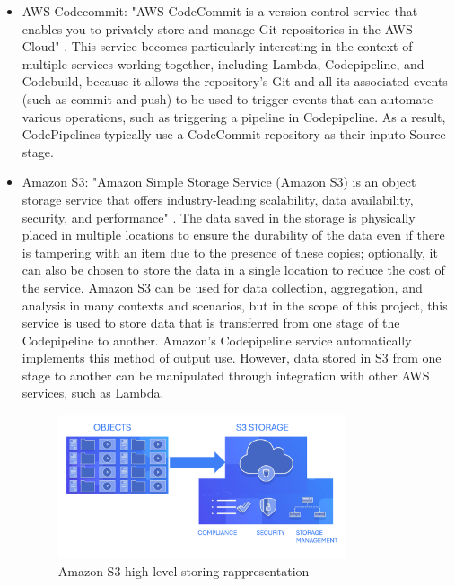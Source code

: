 \begin{itemize}
    \item AWS Codecommit: "AWS CodeCommit is a version control service that enables you to privately store and manage Git repositories in the AWS Cloud" \cite{AWSCodecommit}. This service becomes particularly interesting in the context of multiple services working together, including Lambda, Codepipeline, and Codebuild, because it allows the repository's Git and all its associated events (such as commit and push) to be used to trigger events that can automate various operations, such as triggering a pipeline in Codepipeline. As a result, CodePipelines typically use a CodeCommit repository as their inputo Source stage.
    \item Amazon S3: "Amazon Simple Storage Service (Amazon S3) is an object storage service that offers industry-leading scalability, data availability, security, and performance" \cite{AWSamazonS3}. The data saved in the storage is physically placed in multiple locations to ensure the durability of the data even if there is tampering with an item due to the presence of these copies; optionally, it can also be chosen to store the data in a single location to reduce the cost of the service. Amazon S3 can be used for data collection, aggregation, and analysis in many contexts and scenarios, but in the scope of this project, this service is used to store data that is transferred from one stage of the Codepipeline to another. Amazon's Codepipeline service automatically implements this method of output use. However, data stored in S3 from one stage to another can be manipulated through integration with other AWS services, such as Lambda.
    \begin{figure}[h]  %
        \centering
        \includegraphics[width=0.8\textwidth]{images/AWSS3.png}  %
        \caption{Amazon S3 high level storing rappresentation}
        \label{fig:AWSS3}
    \end{figure}

\end{itemize}
